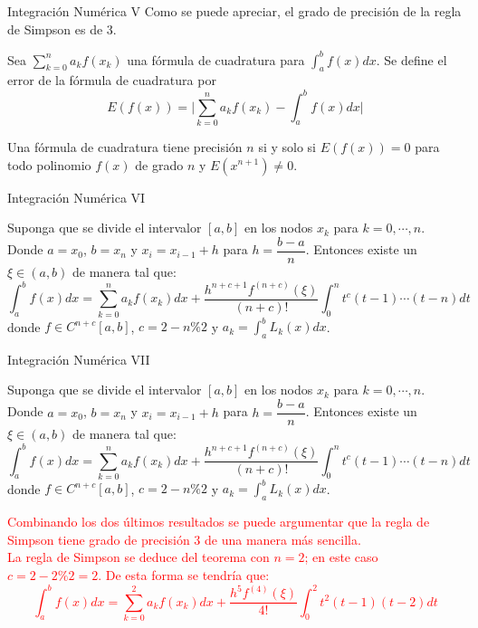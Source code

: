 \begin{frame}{Integración Numérica V}
Como se puede apreciar, el grado de precisión de la regla de Simpson es de 3.
\begin{Def}
Sea $\displaystyle \sum_{k=0}^{n}a_kf(x_k)$ una fórmula de cuadratura para $\displaystyle \int_{a}^{b}f(x)dx$. Se define el error de la fórmula de cuadratura por $$\displaystyle E(f(x))=\bigg|\sum_{k=0}^{n}a_kf(x_k)-\int_{a}^{b}f(x)dx\bigg|$$
\end{Def}
\begin{Teo}
Una fórmula de cuadratura tiene precisión $n$ si y solo si $E(f(x))=0$ para todo polinomio $f(x)$ de grado $n$ y $E(x^{n+1})\neq 0$.
\end{Teo}
\end{frame}
\begin{frame}{Integración Numérica VI}
\begin{Teo}
Suponga que se divide el intervalor $[a,b]$ en los nodos $x_k$ para $k=0,\cdots, n$. Donde $a=x_0$, $b=x_n$ y $x_i=x_{i-1}+h$ para $h=\dfrac{b-a}{n}$. Entonces existe un $\xi\in(a,b)$ de manera tal que:
$$\int_a^b f(x)dx=\sum_{k=0}^{n}a_kf(x_k)dx+\dfrac{h^{n+c+1}f^{(n+c)}(\xi)}{(n+c)!}\int_{0}^{n}t^c(t-1)\cdots(t-n)dt$$
donde $f\in C^{n+c}[a,b]$, $c=2-n\%2$ y $\displaystyle a_k=\int_{a}^{b}L_k(x)dx$.
\end{Teo}
\end{frame}
\begin{frame}{Integración Numérica VII}
\small
\begin{Teo}
Suponga que se divide el intervalor $[a,b]$ en los nodos $x_k$ para $k=0,\cdots, n$. Donde $a=x_0$, $b=x_n$ y $x_i=x_{i-1}+h$ para $h=\dfrac{b-a}{n}$. Entonces existe un $\xi\in(a,b)$ de manera tal que:
$$\int_a^b f(x)dx=\sum_{k=0}^{n}a_kf(x_k)dx+\dfrac{h^{n+c+1}f^{(n+c)}(\xi)}{(n+c)!}\int_{0}^{n}t^c(t-1)\cdots(t-n)dt$$
donde $f\in C^{n+c}[a,b]$, $c=2-n\%2$ y $\displaystyle a_k=\int_{a}^{b}L_k(x)dx$.
\end{Teo}\pause
\textcolor{red}{\indent Combinando los dos últimos resultados se puede argumentar que la regla de Simpson tiene grado de precisión 3 de una manera más sencilla.\\\pause
\indent La regla de Simpson se deduce del teorema con $n=2$; en este caso $c=2-2\%2=2$. De esta forma se tendría que:\\\pause
$$\int_a^b f(x)dx=\sum_{k=0}^{2}a_kf(x_k)dx+\dfrac{h^{5}f^{(4)}(\xi)}{4!}\int_{0}^{2}t^2(t-1)(t-2)dt$$}
\end{frame}
